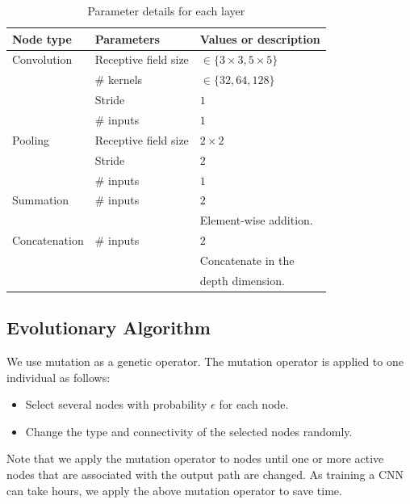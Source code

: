 \begin{table}[tb]
  \caption{Parameter details for each layer}
  \label{layer_param}
  \begin{tabular}{l|l|l} \hline
    Node type & Parameters & Values or description \\ \hline
    Convolution & Receptive field size & $\in \{3\times 3, 5\times 5\}$ \\ 
                        & \# kernels & $\in \{32, 64, 128\}$ \\ 
                       & Stride & $1$ \\ 
                       & \# inputs & $1$ \\ \hline
      Pooling     & Receptive field size & $2\times 2$ \\ 
                       & Stride & $2$ \\ 
                       & \# inputs & $1$ \\ \hline
     Summation & \# inputs & $2$ \\ 
                         &                & Element-wise addition. \\ \hline
 Concatenation & \# inputs & $2$ \\ 
                      &  & Concatenate in the \\
                       &  & depth dimension.\\  \hline
  \end{tabular}
\end{table}


\subsection{Evolutionary Algorithm}
We use mutation as a genetic operator.
The mutation operator is applied to one individual as follows:
\begin{itemize}
  \item Select several nodes with probability $\epsilon$ for each node.
  \item Change the type and connectivity of the selected nodes randomly.
\end{itemize}
Note that we apply the mutation operator to nodes until one or more active nodes that are associated with the output path are changed.
As training a CNN can take hours, we apply the above mutation operator to save time.


